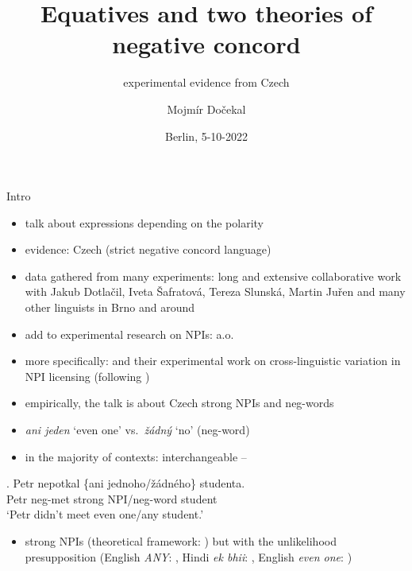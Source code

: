 \documentclass[
  ignorenonframetext,
]{beamer}
\title{Equatives and two theories of negative concord}
\subtitle{experimental evidence from Czech}
\author{Mojmír Dočekal}
\date{Berlin, 5-10-2022}
\institute{FDSL 15}
\providecommand{\tightlist}{%
  \setlength{\itemsep}{0pt}\setlength{\parskip}{0pt}}
\begin{document}
\frame{\titlepage}

\begin{frame}[allowframebreaks]
  \tableofcontents[hideallsubsections]
\end{frame}
\begin{frame}{Intro}
\protect\hypertarget{intro}{}
\begin{itemize}
\tightlist
\item
  talk about expressions depending on the polarity
\item
  evidence: Czech (strict negative concord language)
\item
  data gathered from many experiments: long and extensive collaborative
  work with Jakub Dotlačil, Iveta Šafratová, Tereza Slunská, Martin
  Juřen and many other linguists in Brno and around
\item
  add to experimental research on NPIs:
  \cite{Chemla-Homer-Rothschild-NPI,gajewski2016another,alexandropoulou2020there}
  a.o.
\item
  more specifically: \cite{djarv2018cognitive,schwarz2020italian} and
  their experimental work on cross-linguistic variation in NPI licensing
  (following \citealt{chierchia2019factivity})
\end{itemize}
\end{frame}

\begin{frame}
\begin{itemize}
\tightlist
\item
  empirically, the talk is about Czech strong NPIs and neg-words
\item
  \emph{ani jeden} `even one' vs.~\textit{žádný} `no' (neg-word)
\item
  in the majority of contexts: interchangeable -- \Next
\end{itemize}

\exg. Petr nepotkal \{ani jednoho/žádného\} studenta.\\
Petr neg-met strong NPI/neg-word student\\
`Petr didn't meet even one/any student.'

\begin{itemize}
\tightlist
\item
  strong NPIs (theoretical framework: \citealt{gajewski2011licensing})
  but with the unlikelihood presupposition (English \emph{ANY}:
  \citealt{krifka1995semantics}, Hindi \emph{ek bhii}:
  \citealt{lahiri1998focus}, English \emph{even one}:
  \citealt{crnivc2014non})
\end{itemize}
\end{frame}
\end{document}
